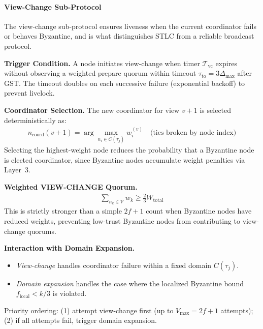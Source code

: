 \documentclass[manuscript,screen,review]{acmart}
\begin{document}
\paragraph{View-Change Sub-Protocol}
\label{sec:view_change}

The view-change sub-protocol ensures liveness when the current coordinator fails or behaves Byzantine, and is what distinguishes STLC from a reliable broadcast protocol.

\textbf{Trigger Condition.} A node initiates view-change when timer $\mathcal{T}_{\text{vc}}$ expires without observing a weighted prepare quorum within timeout $\tau_{\text{to}} = 3\Delta_{\max}$ after GST. The timeout doubles on each successive failure (exponential backoff) to prevent livelock.

\textbf{Coordinator Selection.} The new coordinator for view $v+1$ is selected deterministically as:
\begin{equation}
\begin{aligned}
n_{\text{coord}}(v+1) = \arg\max_{n_i \in C(\tau_j)} w_i^{(v)}
\quad \text{(ties broken by node index)}
\label{eq:coord_selection}
\end{aligned}
\end{equation}
Selecting the highest-weight node reduces the probability that a Byzantine node is elected coordinator, since Byzantine nodes accumulate weight penalties via Layer~3.

\textbf{Weighted VIEW-CHANGE Quorum.}
\begin{equation}
\begin{aligned}
\sum_{n_k \in \mathcal{V}} w_k \geq \frac{2}{3} W_{\text{total}}
\label{eq:vc_quorum}
\end{aligned}
\end{equation}
This is strictly stronger than a simple $2f+1$ count when Byzantine nodes have reduced weights, preventing low-trust Byzantine nodes from contributing to view-change quorums.

\textbf{Interaction with Domain Expansion.}
\begin{itemize}
    \item \textit{View-change} handles coordinator failure within a fixed domain $C(\tau_j)$.
    \item \textit{Domain expansion} handles the case where the localized Byzantine bound $f_{\text{local}} < k/3$ is violated.
\end{itemize}
Priority ordering: (1) attempt view-change first (up to $V_{\max} = 2f+1$ attempts); (2) if all attempts fail, trigger domain expansion.
\end{document}
